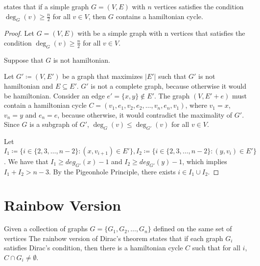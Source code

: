 \cite{dirac1952} states that if a simple graph $G = (V, E)$ with $n$ vertices satisfies the condition $\deg_G(v) \geq \frac{n}{2}$ for all $v \in V$, 
then $G$ contains a hamiltonian cycle.

\begin{proof}
    Let $G = (V, E)$ with be a simple graph with n vertices that satisfies the condition $\deg_G(v) \geq \frac{n}{2}$ for all $v \in V$.

    Suppose that $G$ is not hamiltonian. 

    Let $G' \coloneqq (V, E')$ be a graph that maximizes $|E'|$ such that $G'$ is not hamiltonian and $E \subseteq E'$. 
    $G'$ is not a complete graph, because otherwise it would be hamiltonian. Consider an edge $e' = \{x, y\} \not\in E'$.
    The graph $(V, E' + e)$ must contain a hamiltonian cycle $C = (v_1, e_1, v_2, e_2, \ldots, v_n, e_{n}, v_1)$, where 
    $v_1 = x$, $v_n = y$ and $e_n = e$, because otherwise, it would contradict the maximality of $G'$.
    Since $G$ is a subgraph of $G'$, $\deg_G(v) \leq \deg_{G'}(v)$ for all $v \in V$.

    Let $I_1 \coloneqq \{i \in \{2, 3, \dots, n-2\} : (x, v_{i+1}) \in E'\}, 
    I_2 \coloneqq \{ i \in \{2, 3, \dots, n - 2\} : (y, v_{i}) \in E' \}$.
    We have that $I_1 \geq deg_{G'}(x) - 1$ and $I_2 \geq deg_{G'}(y) - 1$,
    which implies $I_1 + I_2 > n - 3$. By the Pigeonhole Principle, there exists $i \in I_1 \cup I_2$.



\end{proof}

\section{Rainbow Version}

Given a collection of graphs  $G = \{G_1, G_2, \ldots, G_n\}$ defined on the same set of vertices
The rainbow version of Dirac's theorem states that if each graph $G_i$ satisfies Dirac's condition, 
then there is a hamiltonian cycle $C$ such that for all $i$, $C \cap G_i \neq \emptyset$.
